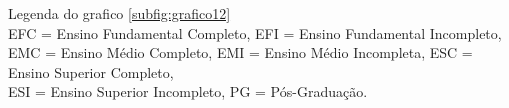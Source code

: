 \documentclass[11pt,a4paper]{article}
\begin{document}
\begin{figure}[H]
{}
\end{figure}

\begin{figure}[H]
\centering
{}
\end{figure} 

\noindent
Legenda do grafico \ref{subfig:grafico12}\\
EFC = Ensino Fundamental Completo, EFI = Ensino Fundamental Incompleto, \\EMC = Ensino Médio Completo,
EMI = Ensino Médio Incompleta, ESC = Ensino Superior Completo,\\
ESI = Ensino Superior Incompleto, PG = Pós-Graduação.

\vspace{1cm}


\begin{figure}[H]
\centering
{}
\end{figure}
\end{document}
